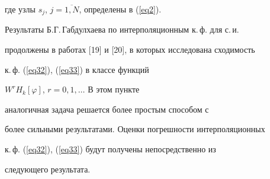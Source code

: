 где узлы $s_j$, $j=\overline{1,N}$, определены в (\ref{eq2}).





Результаты Б.Г.\,Габдулхаева по интерполяционным к.\,ф. для с.\,и.


продолжены в работах [19] и [20], в которых исследована сходимость


к.\,ф. (\ref{eq32}), (\ref{eq33}) в классе функций


$W^rH_k[\varphi]$, $r=0,1,\dotsc$ В этом пункте


аналогичная задача решается более простым способом с


более сильными результатами. Оценки погрешности интерполяционных


к.\,ф. (\ref{eq32}), (\ref{eq33}) будут получены непосредственно из


следующего результата.








